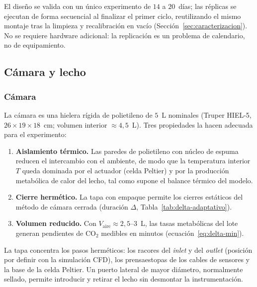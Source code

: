 \begin{remark}\label{rem:escalado}
El diseño se valida con un único experimento de $14$ a $20$~días; las réplicas
se ejecutan de forma secuencial al finalizar el primer ciclo, reutilizando el
mismo montaje tras la limpieza y recalibración en vacío
(Sección~\ref{sec:caracterizacion}). No se requiere hardware adicional: la
replicación es un problema de calendario, no de equipamiento.
\end{remark}

\subsection{Cámara y lecho}\label{sec:camara-lecho}

\subsubsection{Cámara}

La cámara es una hielera rígida de polietileno de $5$~L nominales (Truper
HIEL-5, $26 \times 19 \times 18$~cm; volumen interior $\approx 4{,}5$~L). Tres
propiedades la hacen adecuada para el experimento:

\begin{enumerate}
  \item \textbf{Aislamiento térmico.} Las paredes de polietileno con núcleo de
  espuma reducen el intercambio con el ambiente, de modo que la temperatura
  interior $T$ queda dominada por el actuador (celda Peltier) y por la
  producción metabólica de calor del lecho, tal como supone el balance
  térmico del modelo.
  \item \textbf{Cierre hermético.} La tapa con empaque permite los cierres
  estáticos del método de cámara cerrada (duración $\Delta$,
  Tabla~\ref{tab:delta-adaptativo}).
  \item \textbf{Volumen reducido.} Con $V_{\mathrm{aire}} \approx 2{,}5$--$3$~L,
  las tasas metabólicas del lote generan pendientes de CO$_2$ medibles en
  minutos (ecuación~\eqref{eq:delta-min}).
\end{enumerate}

La tapa concentra los pasos herméticos: los racores del \emph{inlet} y del
\emph{outlet} (posición por definir con la simulación CFD), los prensaestopas
de los cables de sensores y la base de la celda Peltier. Un puerto lateral de
mayor diámetro, normalmente sellado, permite introducir y retirar el lecho sin
desmontar la instrumentación.

